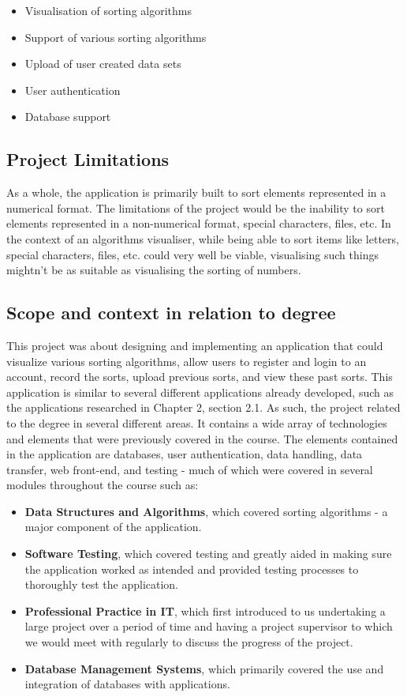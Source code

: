 \begin{itemize}
    \item Visualisation of sorting algorithms
    \item Support of various sorting algorithms
    \item Upload of user created data sets
    \item User authentication
    \item Database support
\end{itemize}

\subsection{Project Limitations}
As a whole, the application is primarily built to sort elements represented in a
numerical format. The limitations of the project would be the inability to sort 
elements represented in a non-numerical format, special characters, files, etc. In the context of an algorithms visualiser, while being able to sort items like letters, special characters, files, etc. could very well be viable, visualising such things mightn't be as suitable as visualising the sorting of numbers.

\newpage
\subsection{Scope and context in relation to degree}
This project was about designing and implementing an application that could visualize various sorting algorithms, allow users to register and login to an account, record the sorts, upload previous sorts, and view these past sorts. This application is similar to several different applications already developed, such as the applications researched in Chapter 2, section 2.1. As such, the project related to the degree in several different areas. It contains a wide array of technologies and elements that were previously covered in the course. The elements contained in the application are databases, user authentication, data handling, data transfer, web front-end, and testing - much of which were covered in several modules throughout the course such as: 

\begin{itemize}
    \item \textbf{Data Structures and Algorithms}, which covered sorting algorithms - a major component of the application.
    \item \textbf{Software Testing}, which covered testing and greatly aided in making sure the application worked as intended and provided testing processes to thoroughly test the application.
    \item \textbf{Professional Practice in IT}, which first introduced to us undertaking a large project over a period of time and having a project supervisor to which we would meet with regularly to discuss the progress of the project.
    \item \textbf{Database Management Systems}, which primarily covered the use and integration of databases with applications.
\end{itemize}